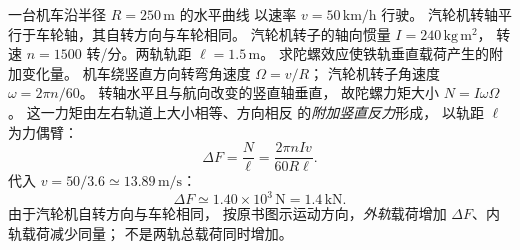 一台机车沿半径 $R=250\,\mathrm m$ 的水平曲线
以速率 $v=50\,\mathrm{km/h}$ 行驶。
汽轮机转轴平行于车轮轴，其自转方向与车轮相同。
汽轮机转子的轴向惯量
$I=240\,\mathrm{kg\,m^2}$，
转速 $n=1500$ 转/分。两轨轨距
$\ell=1.5\,\mathrm m$。
求陀螺效应使铁轨垂直载荷产生的附加变化量。
\exsolution
机车绕竖直方向转弯角速度
$\Omega=v/R$；
汽轮机转子角速度
$\omega=2\pi n/60$。
转轴水平且与航向改变的竖直轴垂直，
故陀螺力矩大小
$N=I\omega\Omega$。
这一力矩由左右轨道上大小相等、方向相反
的\emph{附加竖直反力}形成，
以轨距 $\ell$ 为力偶臂：
\[
\boxed{\Delta F=\frac{N}{\ell}
=\frac{2\pi nIv}{60R\ell}}.
\]
代入
$v=50/3.6\simeq13.89\,\mathrm{m/s}$：
\[
\boxed{\Delta F\simeq1.40\times10^3\,\mathrm N
=1.4\,\mathrm{kN}}.
\]
\excheck 由于汽轮机自转方向与车轮相同，
按原书图示运动方向，\emph{外轨}载荷增加
$\Delta F$、内轨载荷减少同量；
不是两轨总载荷同时增加。
